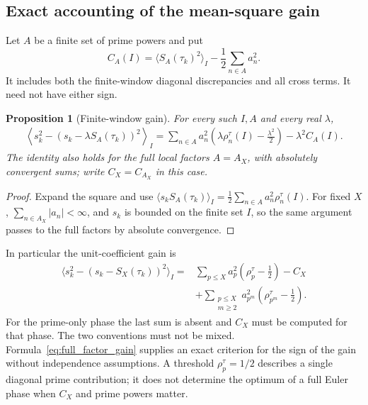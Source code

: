 \documentclass[11pt,reqno]{amsart}
\theoremstyle{plain}\newtheorem{theorem}{Theorem}[section]\newtheorem{proposition}[theorem]{Proposition}\newtheorem{lemma}[theorem]{Lemma}\newtheorem{corollary}[theorem]{Corollary}
\theoremstyle{definition}\newtheorem{hypothesis}[theorem]{Hypothesis}\newtheorem{definition}[theorem]{Definition}
\theoremstyle{remark}\newtheorem{remark}[theorem]{Remark}\newtheorem{experiment}[theorem]{Experiment}\newtheorem{question}[theorem]{Question}\newtheorem{heuristic}[theorem]{Heuristic}\newtheorem{conjecture}[theorem]{Conjecture}
\begin{document}
\subsection{Exact accounting of the mean-square gain}
\label{subsec:exact_accounting}
Let $A$ be a finite set of prime powers and put
\begin{equation}
 C_A(I)=\langle S_A(\tau_k)^2\rangle_I-\frac12\sum_{n\in A}a_n^2.
 \label{eq:CA_def}
\end{equation}
It includes both the finite-window diagonal discrepancies and all cross terms. It need not have either sign.

\begin{proposition}[Finite-window gain]\label{prop:exact_gain}
For every such $I,A$ and every real $\lambda$,
\begin{equation}
 \begin{split}
 \left\langle s_k^2-(s_k-\lambda S_A(\tau_k))^2\right\rangle_I
 =\sum_{n\in A}a_n^2\left(\lambda\rho_n^\tau(I)-\frac{\lambda^2}{2}\right)
 -\lambda^2C_A(I).
 \end{split}
 \label{eq:exact_gain}
\end{equation}
The identity also holds for the full local factors $A=A_X$, with absolutely convergent sums; write $C_X=C_{A_X}$ in this case.
\end{proposition}
\begin{proof}
Expand the square and use $\langle s_kS_A(\tau_k)\rangle_I=\frac12\sum_{n\in A}a_n^2\rho_n^\tau(I)$. For fixed $X$, $\sum_{n\in A_X}|a_n|<\infty$, and $s_k$ is bounded on the finite set $I$, so the same argument passes to the full factors by absolute convergence.
\end{proof}
In particular the unit-coefficient gain is
\begin{equation}
 \begin{split}
 \langle s_k^2-(s_k-S_X(\tau_k))^2\rangle_I
 ={}&\sum_{p\le X}a_p^2\left(\rho_p^\tau-\tfrac12\right)-C_X\\
 &+\sum_{\substack{p\le X\\m\ge2}}a_{p^m}^2
       \left(\rho_{p^m}^\tau-\tfrac12\right).
 \end{split}
 \label{eq:full_factor_gain}
\end{equation}
For the prime-only phase the last sum is absent and $C_X$ must be computed for that phase. The two conventions must not be mixed. Formula~\eqref{eq:full_factor_gain} supplies an exact criterion for the sign of the gain without independence assumptions. A threshold $\rho_p^\tau=1/2$ describes a single diagonal prime contribution; it does not determine the optimum of a full Euler phase when $C_X$ and prime powers matter.
\end{document}
